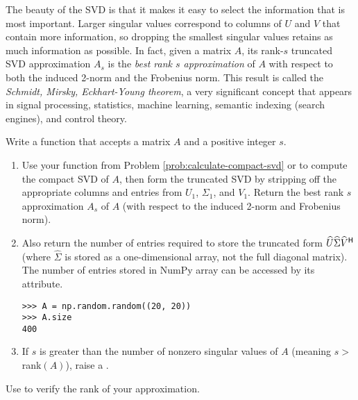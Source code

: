 The beauty of the SVD is that it makes it easy to select the information that is most important.
Larger singular values correspond to columns of $U$ and $V$ that contain more information, so dropping the smallest singular values retains as much information as possible.
In fact, given a matrix $A$, its rank-$s$ truncated SVD approximation $A_s$ is the \emph{best rank $s$ approximation} of $A$ with respect to both the induced 2-norm and the Frobenius norm.
This result is called the \emph{Schmidt, Mirsky, Eckhart-Young theorem}, a very significant concept that appears in signal processing, statistics, machine learning, semantic indexing (search engines), and control theory.

\begin{comment}
We can also calculate $A_s$ by finding the full SVD, and setting all singular values after the $k$th to zero.
Thus the modified $\Sigma$ would be
\begin{equation*}
\Sigma_{s} = \mbox{diag}(\sigma_1,\sigma_2,\ldots,\sigma_s,0,\ldots,0).
\end{equation*}
Multiplying this matrix with the original $U$ and $V\hrm$ will give the same $A_s$ that was found by computing the truncated SVD directly.
\end{comment}

\begin{problem} %
Write a function that accepts a matrix $A$ and a positive integer $s$.
\begin{enumerate}
\item Use your function from Problem \ref{prob:calculate-compact-svd} or  to compute the compact SVD of $A$, then form the truncated SVD by stripping off the appropriate columns and entries from $U_1$, $\Sigma_1$, and $V_1$.
Return the best rank $s$ approximation $A_s$ of $A$ (with respect to the induced 2-norm and Frobenius norm).
\item Also return the number of entries required to store the truncated form $\widehat{U}\widehat{\Sigma} \widehat{V}^{\mathsf H}$ (where $\widehat{\Sigma}$ is stored as a one-dimensional array, not the full diagonal matrix).
The number of entries stored in NumPy array can be accessed by its  attribute.
\begin{lstlisting}
>>> A = np.random.random((20, 20))
>>> A.size
400
\end{lstlisting}
\item If $s$ is greater than the number of nonzero singular values of $A$ (meaning $s > $ rank$(A)$), raise a .
\end{enumerate}
Use  to verify the rank of your approximation.
\label{prob:svd_approx}
\end{problem}

